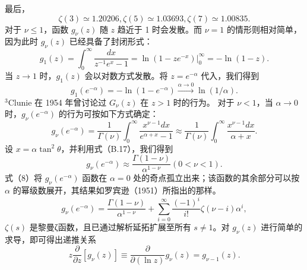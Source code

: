 最后，
\begin{equation}\tag{17.4.7}\label{eq:17.4.7}
\zeta ( 3 ) \simeq 1 . 20 20 6 ,  \zeta ( 5 ) \simeq 1 . 03 69 3 ,  \zeta ( 7 ) \simeq 1 . 00 83 5 .
\end{equation}
对于 \(\nu \leq 1\)，函数 \(g_{\nu}(z)\) 随 \(z\) 趋近于 1 时会发散。而 \(\nu = 1\) 的情形则相对简单，因为此时 \(g_{\nu}(z)\) 已经具备了封闭形式：
\begin{equation}\tag{17.4.8}\label{eq:17.4.8}
g _ { 1 } ( z ) = \int _ { 0 } ^{\infty} \frac { d x } { z ^{- 1} e ^{x} - 1 } = \ln ( 1 - z e ^{- x} ) \bigg | _ { 0 } ^{\infty} = - \ln ( 1 - z ) .
\end{equation}
当 \(z \to 1\) 时，\(g_{1}(z)\) 会以对数方式发散。将 \(z = e^{-\alpha}\) 代入，我们得到
\begin{equation}\tag{17.4.9}\label{eq:17.4.9}
g _ { 1 } ( e ^{- \alpha} ) = - \ln ( 1 - e ^{- \alpha} ) \xrightarrow { \alpha \rightarrow 0 } \ln ( 1 / \alpha ) .
\end{equation}
\(^{3}\)Clunie 在 1954 年曾讨论过 \(G_{\nu}(z)\) 在 \(z > 1\) 时的行为。
对于 \(\nu < 1\)，当 \(\alpha \to 0\) 时，\(g_{\nu}(e^{-\alpha})\) 的行为可按如下方式确定：
\begin{equation}\tag{17.4.10}\label{eq:17.4.10}
g _ { \nu } ( e ^{- \alpha} ) = \frac { 1 } { \Gamma ( \nu ) } \int _ { 0 } ^{\infty} \frac { x ^{\nu - 1} d x } { e ^{\alpha + x} - 1 } \approx \frac { 1 } { \Gamma ( \nu ) } \int _ { 0 } ^{\infty} \frac { x ^{\nu - 1} d x } { \alpha + x } .
\end{equation}
设 \(x = \alpha\tan^{2}\theta\)，并利用式（B.17），我们得到
\begin{equation}\tag{17.4.11}\label{eq:17.4.11}
g _ { \nu } ( e ^{- \alpha} ) \approx \frac { \Gamma ( 1 - \nu ) } { \alpha ^{1 - \nu} }  ( 0 < \nu < 1 ) .
\end{equation}
式（8）将 \(g_{\nu}(e^{-\alpha})\) 函数在 \(\alpha=0\) 处的奇点孤立出来；该函数的其余部分可以按 \(\alpha\) 的幂级数展开，其结果如罗宾逊（1951）所指出的那样。
\begin{equation}\tag{17.4.12}\label{eq:17.4.12}
g _ { \nu } ( e ^{- \alpha} ) = \frac { \Gamma ( 1 - \nu ) } { \alpha ^{1 - \nu} } + \sum _ { i = 0 } ^{\infty} \frac { ( - 1 ) ^{i} } { i ! } \zeta ( \nu - i ) \alpha ^{i} ,
\end{equation}
\(\zeta(s)\) 是黎曼ζ函数，且已通过解析延拓扩展至所有 \(s \neq 1\)。对 \(g_{\nu}(z)\) 进行简单的求导，即可得出递推关系
\begin{equation}\tag{17.4.13}\label{eq:17.4.13}
z \frac { \partial } { \partial z } [ g _ { \nu } ( z ) ] \equiv \frac { \partial } { \partial ( \ln z ) } g _ { \nu } ( z ) = g _ { \nu - 1 } ( z ) .
\end{equation}
